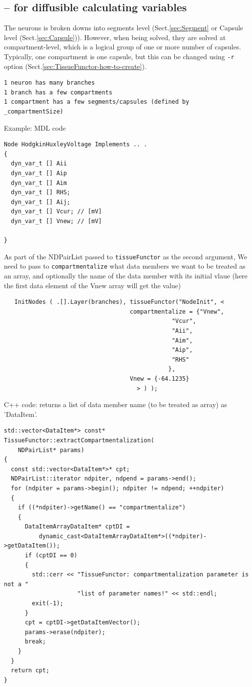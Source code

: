 \subsection{-- for diffusible calculating variables}

The neurons is broken downs into segments level (Sect.\ref{sec:Segment} or
Capsule level (Sect.\ref{sec:Capsule})). However, when being solved, they are
solved at compartment-level, which is a logical group of one or more number of
capsules. Typically, one compartment is one capsule, but this can be changed
using \verb!-r! option (Sect.\ref{sec:TissueFunctor-how-to-create}).
\begin{verbatim}
1 neuron has many branches
1 branch has a few compartments
1 compartment has a few segments/capsules (defined by _compartmentSize)
\end{verbatim}

Example: MDL code
\begin{verbatim}
Node HodgkinHuxleyVoltage Implements .. .
{
  dyn_var_t [] Aii
  dyn_var_t [] Aip
  dyn_var_t [] Aim
  dyn_var_t [] RHS;
  dyn_var_t [] Aij;
  dyn_var_t [] Vcur; // [mV]
  dyn_var_t [] Vnew; // [mV]
  
}
\end{verbatim}


As part of the NDPairList passed to \verb!tissueFunctor! as the second
argument, We need to pass to \verb!compartmentalize! what data members we want
to be treated as an array, and optionally the name of the data member with its
initial vlaue (here the first data element of the Vnew array will get the value)
{\tiny
\begin{verbatim}
   InitNodes ( .[].Layer(branches), tissueFunctor("NodeInit", <
									compartmentalize = {"Vnew", 
											    "Vcur", 
											    "Aii", 
											    "Aim", 
											    "Aip", 
											    "RHS"
											   },
									Vnew = {-64.1235}
								      > ) );
\end{verbatim}
}

C++ code: returns a list of data member name (to be treated as array) as
'DataItem'.

\begin{lstlisting}
std::vector<DataItem*> const* TissueFunctor::extractCompartmentalization(
    NDPairList* params)
{
  const std::vector<DataItem*>* cpt;
  NDPairList::iterator ndpiter, ndpend = params->end();
  for (ndpiter = params->begin(); ndpiter != ndpend; ++ndpiter)
  {
    if ((*ndpiter)->getName() == "compartmentalize")
    {
      DataItemArrayDataItem* cptDI =
          dynamic_cast<DataItemArrayDataItem*>((*ndpiter)->getDataItem());
      if (cptDI == 0)
      {
        std::cerr << "TissueFunctor: compartmentalization parameter is not a "
                     "list of parameter names!" << std::endl;
        exit(-1);
      }
      cpt = cptDI->getDataItemVector();
      params->erase(ndpiter);
      break;
    }
  }
  return cpt;
}
\end{lstlisting}

